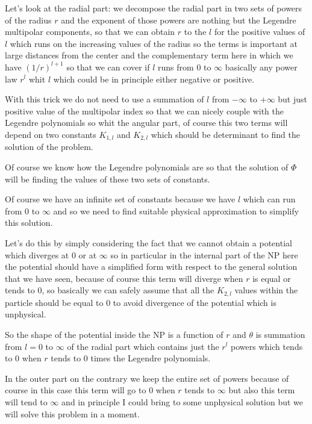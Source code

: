 \documentclass[../main/main.tex]{subfiles}
\begin{document}
Let's look at the radial part: we decompose the radial part in two sets of powers of the radius $r$ and the exponent of those powers are nothing but the Legendre multipolar components, so that we can obtain $r$ to the $l$ for the positive values of $l$ which runs on the increasing values of the radius so the terms is important at large distances from  the center and the complementary term here in which we have $(1/r)^{l+1}$ so that we can cover if $l$ runs from $0$ to $\infty$ basically any power law $r^l$ whit $l$ which could be in principle either negative or positive.

With this trick we do not need to use a summation of $l$ from $-\infty$ to $+\infty$ but just positive value of the multipolar index so that we can nicely couple with the Legendre polynomials so whit the angular part, of course this two terms will depend on two constants $K_{1,l}$ and $K_{2,l}$ which should be determinant to find the solution of the problem.

Of course we know how the Legendre polynomials are so that the solution of $\Phi$ will be finding the values of these two sets of constants. 

Of course we have an infinite set of constants because we have $l$ which can run from $0$ to $\infty$ and so we need to find suitable physical approximation to simplify this solution.

Let's do this by simply considering the fact that we cannot obtain a potential which diverges at $0$ or at $\infty$ so in particular in the internal part of the NP here the potential should have a simplified form with respect to the general solution that we have seen, because of course this term will diverge when $r$ is equal or tends to $0$, so basically we can safely assume that all the $K_{2,l}$ values within the particle should be equal to $0$ to avoid divergence of the potential which is unphysical.

So the shape of the potential inside the NP is a function of $r$ and $\theta$ is summation from $l=0$ to $\infty$ of the radial part which contains just the $r^l$ powers which tends to $0$ when $r$ tends to $0$ times the Legendre polynomials. 

In the outer part on the contrary we keep the entire set of powers because of course in this case this term will go to $0$ when $r$ tends to $\infty$ but also this term will tend to $\infty$ and in principle I could bring to some unphysical solution but we will solve this problem in a moment.
\end{document}
